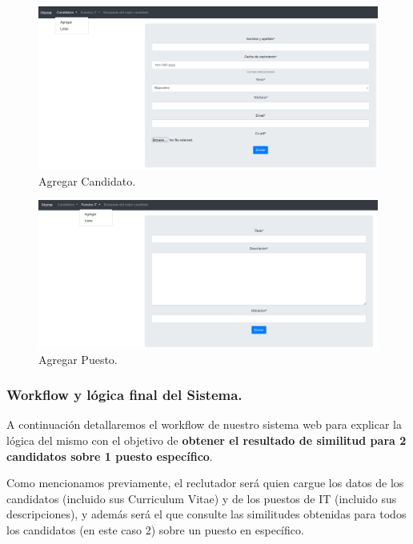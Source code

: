 \documentclass[12pt,a4paper]{article}
\begin{document}
\begin{sloppypar}
\begin{figure}[H]    %
 \centering
 \includegraphics[width=1\textwidth]{images/implementacion_web/impl_web_3.png}
 \caption{Agregar Candidato.} 
 \label{fig:impl_web_3}
\end{figure}

\begin{figure}[H]    %
 \centering
 \includegraphics[width=1\textwidth]{images/implementacion_web/impl_web_4.png}
 \caption{Agregar Puesto.} 
 \label{fig:impl_web_4}
\end{figure}

\cleardoublepage

\subsubsection{Workflow y lógica final del Sistema.}

A continuación detallaremos el workflow de nuestro sistema web para explicar la lógica del mismo con el objetivo de \textbf{obtener el resultado de similitud para 2 candidatos sobre 1 puesto específico}.

Como mencionamos previamente, el reclutador será quien cargue los datos de los candidatos (incluido sus Curriculum Vitae) y de los puestos de IT (incluido sus descripciones), y además será el que consulte las similitudes obtenidas para todos los candidatos (en este caso 2) sobre un puesto en específico.


\end{sloppypar}
\end{document}
